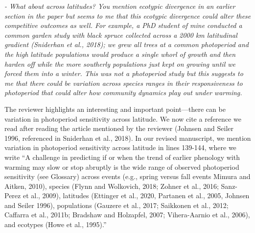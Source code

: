 \documentclass{article}
\begin{document}
 \par \emph{- What about across latitudes? You mention ecotypic divergence in an earlier section in the paper but seems to me that this ecotypic divergence could alter these competitive outcomes as well. For example, a PhD student of mine conducted a common garden study with black spruce collected across a 2000 km latitudinal gradient (Sniderhan et al., 2018); we grew all trees at a common photoperiod and the high latitude populations would produce a single whorl of growth and then harden off while the more southerly populations just kept on growing until we forced them into a winter. This was not a photoperiod study but this suggests to me that there could be variation across species ranges in their responsiveness to photoperiod that could alter how community dynamics play out under warming.}
\par The reviewer highlights an interesting and important point---there can be variation in photoperiod sensitivity across latitude. We now cite a reference we read after reading the article mentioned by the reviewer (Johnsen and Seiler 1996, referenced in Sniderhan et al., 2018). In our revised manuscript, we mention variation in photoperiod sensitivity across latitude in lines 139-144, where we write ``A challenge in predicting if or when the trend of earlier phenology with warming may slow or stop abruptly is the wide range of observed photoperiod sensitivity (see Glossary) across events (e.g., spring versus fall events Mimura and Aitken, 2010), species (Flynn and Wolkovich, 2018; Zohner et al., 2016; Sanz-Perez et al., 2009), latitudes (Ettinger et al., 2020, Partanen et al., 2005, Johnsen and Seiler 1996), populations (Gauzere et al., 2017; Saikkonen et al., 2012; Caffarra et al., 2011b; Bradshaw and Holzapfel, 2007; Vihera-Aarnio et al., 2006), and ecotypes (Howe et al., 1995).''
\end{document}
